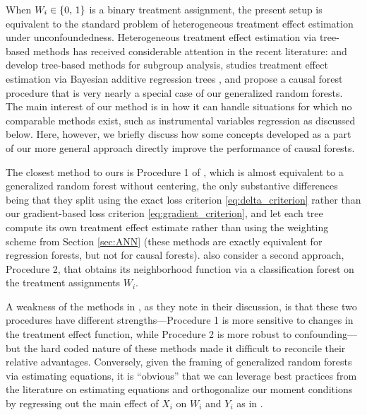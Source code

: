 \documentclass[aos]{imsart}
\theoremstyle{plain}
\theoremstyle{definition}
\theoremstyle{remark}
\begin{document}
\begin{CJK}{UTF8}{gbsn}
When $W_i \in \left\{0, \, 1\right\}$ is a binary treatment assignment,
the present setup is equivalent to the standard problem of heterogeneous
treatment effect estimation under unconfoundedness.
Heterogeneous treatment effect estimation via tree-based methods has received considerable
attention in the recent literature: \citet{athey2016recursive} and \citet{su2009subgroup}
develop tree-based methods for subgroup analysis, \citet{hill2011bayesian}
studies treatment effect estimation via Bayesian additive regression trees
\citep{chipman2010bart}, and \citet{wager2015estimation} propose a causal forest
procedure that is very nearly a special case of our generalized random forests.
The main interest of our method is in how it can handle situations for which no
comparable methods exist, such as instrumental variables regression as discussed below.
Here, however, we briefly discuss how some concepts developed as a part of our more
general approach directly improve the performance of causal forests.

The closest method to ours is Procedure 1
of \citet{wager2015estimation}, which is almost equivalent to a generalized random forest without centering,
the only substantive differences being that they split using the exact loss
criterion \eqref{eq:delta_criterion} rather than our gradient-based loss criterion \eqref{eq:gradient_criterion},
and let each tree compute its own treatment effect estimate rather than using the weighting scheme
from Section \ref{sec:ANN} (these methods are exactly equivalent for regression forests, but not
for causal forests).
\citet{wager2015estimation} also consider a second approach, Procedure 2, that obtains its
neighborhood function via a classification forest on the treatment assignments $W_i$.

A weakness of the methods in \citet{wager2015estimation}, as they note in their discussion, is
that these two procedures have different strengths---Procedure 1 is more sensitive to changes
in the treatment effect function, while Procedure 2 is more robust to confounding---but the
hard coded nature of these methods made it difficult to reconcile their relative advantages.
Conversely, given the framing of generalized random forests via
estimating equations, it is ``obvious'' that we can leverage best practices from the literature
on estimating equations and orthogonalize our moment conditions by regressing
out the main effect of $X_i$ on $W_i$ and $Y_i$ as in \citet{robinson1988root}.


\end{CJK}
\end{document}
